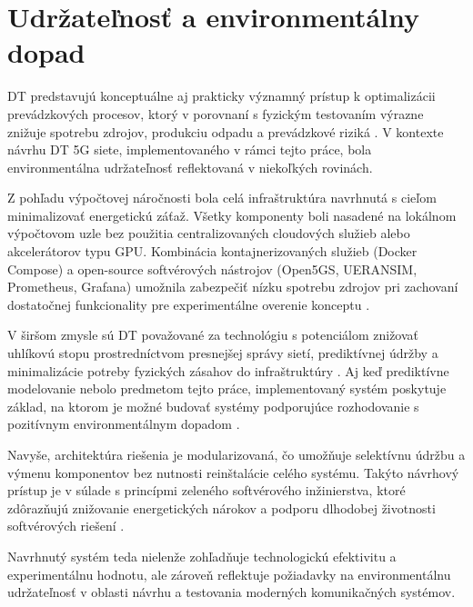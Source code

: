 \section{Udržateľnosť a environmentálny dopad}
DT predstavujú konceptuálne aj prakticky významný prístup k optimalizácii prevádzkových procesov, ktorý v porovnaní s fyzickým testovaním výrazne znižuje spotrebu zdrojov, produkciu odpadu a prevádzkové riziká \cite{enviro_raw_materials}. V kontexte návrhu DT 5G siete, implementovaného v rámci tejto práce, bola environmentálna udržateľnosť reflektovaná v niekoľkých rovinách.

Z pohľadu výpočtovej náročnosti bola celá infraštruktúra navrhnutá s cieľom minimalizovať energetickú záťaž. Všetky komponenty boli nasadené na lokálnom výpočtovom uzle bez použitia centralizovaných cloudových služieb alebo akcelerátorov typu GPU. Kombinácia kontajnerizovaných služieb (Docker Compose) a open-source softvérových nástrojov (Open5GS, UERANSIM, Prometheus, Grafana) umožnila zabezpečiť nízku spotrebu zdrojov pri zachovaní dostatočnej funkcionality pre experimentálne overenie konceptu \cite{docker_enviro, docker_enviro_2}.

V širšom zmysle sú DT považované za technológiu s potenciálom znižovať uhlíkovú stopu prostredníctvom presnejšej správy sietí, prediktívnej údržby a minimalizácie potreby fyzických zásahov do infraštruktúry \cite{DT_edge_networks_IoT, enviro}. Aj keď prediktívne modelovanie nebolo predmetom tejto práce, implementovaný systém poskytuje základ, na ktorom je možné budovať systémy podporujúce rozhodovanie s pozitívnym environmentálnym dopadom \cite{malaysia_enviro}.

Navyše, architektúra riešenia je modularizovaná, čo umožňuje selektívnu údržbu a výmenu komponentov bez nutnosti reinštalácie celého systému. Takýto návrhový prístup je v súlade s princípmi zeleného softvérového inžinierstva, ktoré zdôrazňujú znižovanie energetických nárokov a podporu dlhodobej životnosti softvérových riešení \cite{modular_sw}.

Navrhnutý systém teda nielenže zohľadňuje technologickú efektivitu a experimentálnu hodnotu, ale zároveň reflektuje požiadavky na environmentálnu udržateľnosť v oblasti návrhu a testovania moderných komunikačných systémov.
